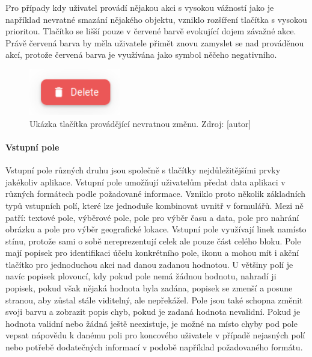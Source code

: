 			Pro případy kdy uživatel provádí nějakou akci s vysokou vážností jako je například nevratné smazání nějakého
			objektu, vzniklo rozšíření tlačítka s vysokou prioritou.
			Tlačítko se lišší pouze v červené barvě evokující dojem závažné akce.
			Právě červená barva by měla uživatele přimět znovu zamyslet se nad prováděnou akcí, protože červená barva
			je využívána jako symbol něčeho negativního.

			\begin{figure}[H]
				\centering
				\includegraphics[width=4cm]{obrazky/tlacitko_s_velkou_prioritou_a_velkou_vaznosti}\hfill
				\caption{Ukázka tlačítka provádějící nevratnou změnu. Zdroj: [autor]}
			\end{figure}

			\paragraph{Vstupní pole}

			Vstupní pole různých druhu jsou společně s tlačítky nejdůležitějšími prvky jakékoliv aplikace.
			Vstupní pole umožňují uživatelům předat data aplikaci v různých formátech podle požadované informace.
			Vzniklo proto několik základních typů vstupních polí, které lze jednoduše kombinovat uvnitř v formulářů.
			Mezi ně patří: textové pole, výběrové pole, pole pro výběr času a data, pole pro nahrání obrázku a pole pro
			výběr geografické lokace.
			Vstupní pole využívají linek namísto stínu, protože sami o sobě nereprezentují celek ale pouze část celého
			bloku.
			Pole mají popisek pro identifikaci účelu konkrétního pole, ikonu a mohou mít i akční tlačítko pro jednoduchou
			akci nad danou zadanou hodnotou.
			U většiny polí je navíc popisek plovoucí, kdy pokud pole nemá žádnou hodnotu, nahradí ji popisek, pokud však
			nějaká hodnota byla zadána, popisek se zmenší a posune stranou, aby zůstal stále viditelný, ale nepřekážel.
			Pole jsou také schopna změnit svoji barvu a zobrazit popis chyb, pokud je zadaná hodnota nevalidní.
			Pokud je hodnota validní nebo žádná ještě neexistuje, je možné na místo chyby pod pole vepsat nápovědu k danému
			poli pro koncového uživatele v případě nejasných polí nebo potřebě dodatečných informací v podobě například
			požadovaného formátu.

